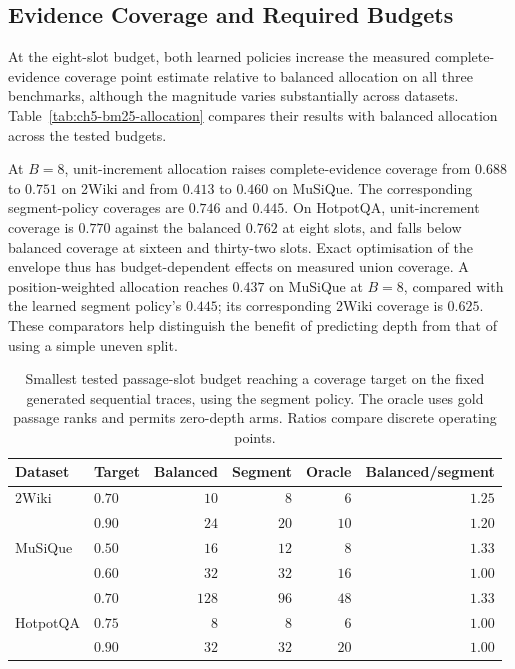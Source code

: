 \subsection{Evidence Coverage and Required Budgets}

At the eight-slot budget, both learned policies increase the measured complete-evidence coverage point estimate relative to balanced allocation on all three benchmarks, although the magnitude varies substantially across datasets. Table~\ref{tab:ch5-bm25-allocation}
compares their results with balanced allocation across the tested budgets.



At $B=8$, unit-increment allocation raises complete-evidence coverage from
$0.688$ to $0.751$ on 2Wiki and from $0.413$ to $0.460$ on MuSiQue.
The corresponding segment-policy coverages are $0.746$ and $0.445$.
On HotpotQA, unit-increment coverage is $0.770$ against the balanced
$0.762$ at eight slots, and falls below balanced coverage at sixteen and
thirty-two slots. Exact optimisation of the envelope thus has
budget-dependent effects on measured union coverage. A position-weighted
allocation reaches $0.437$ on MuSiQue at $B=8$, compared with the learned
segment policy's $0.445$; its corresponding 2Wiki coverage is $0.625$. These
comparators help distinguish the benefit of predicting depth from that of
using a simple uneven split.

\begin{table}[H]
\centering
\small
\caption{Smallest tested passage-slot budget reaching a coverage target on
the fixed generated sequential traces, using the segment policy. The oracle uses gold passage ranks
and permits zero-depth arms. Ratios compare discrete operating points.}
\label{tab:ch5-allocation-targets}
\begin{tabular}{llrrrr}
\hline
Dataset & Target & Balanced & Segment & Oracle & Balanced/segment \\
\hline
2Wiki & $0.70$ & $10$ & $8$ & $6$ & $1.25$ \\
      & $0.90$ & $24$ & $20$ & $10$ & $1.20$ \\
MuSiQue & $0.50$ & $16$ & $12$ & $8$ & $1.33$ \\
        & $0.60$ & $32$ & $32$ & $16$ & $1.00$ \\
        & $0.70$ & $128$ & $96$ & $48$ & $1.33$ \\
HotpotQA & $0.75$ & $8$ & $8$ & $6$ & $1.00$ \\
         & $0.90$ & $32$ & $32$ & $20$ & $1.00$ \\
\hline
\end{tabular}
\end{table}

